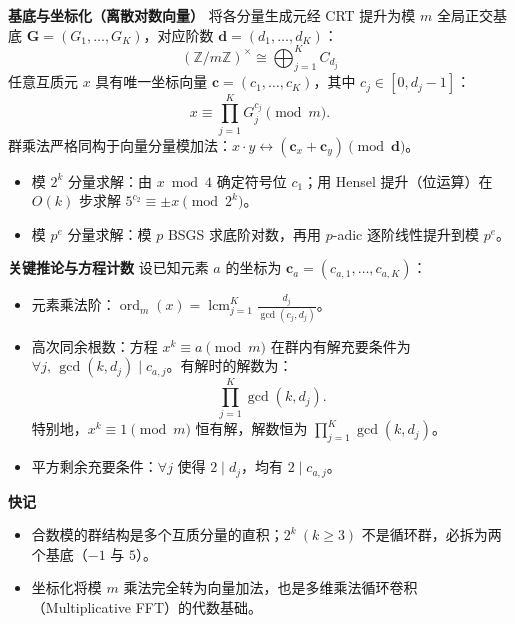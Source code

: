 \textbf{基底与坐标化（离散对数向量）}
将各分量生成元经 CRT 提升为模 $m$ 全局正交基底 $\mathbf{G} = (G_1, \dots, G_K)$，对应阶数 $\mathbf{d} = (d_1, \dots, d_K)$：
\[
(\mathbb{Z}/m\mathbb{Z})^\times \cong \bigoplus_{j=1}^K C_{d_j}
\]
任意互质元 $x$ 具有唯一坐标向量 $\mathbf{c} = (c_1, \dots, c_K)$，其中 $c_j \in [0, d_j - 1]$：
\[
x \equiv \prod_{j=1}^K G_j^{c_j} \pmod m.
\]
群乘法严格同构于向量分量模加法：$x \cdot y \leftrightarrow (\mathbf{c}_x + \mathbf{c}_y) \pmod{\mathbf{d}}$。
\begin{itemize}
\item 模 $2^k$ 分量求解：由 $x\bmod 4$ 确定符号位 $c_1$；用 Hensel 提升（位运算）在 $O(k)$ 步求解 $5^{c_2}\equiv \pm x\pmod{2^k}$。
\item 模 $p^e$ 分量求解：模 $p$ BSGS 求底阶对数，再用 $p$-adic 逐阶线性提升到模 $p^e$。
\end{itemize}

\textbf{关键推论与方程计数}
设已知元素 $a$ 的坐标为 $\mathbf{c}_a = (c_{a,1}, \dots, c_{a,K})$：
\begin{itemize}
\item 元素乘法阶：$\operatorname{ord}_m(x) = \operatorname{lcm}_{j=1}^K \frac{d_j}{\gcd(c_j, d_j)}$。
\item 高次同余根数：方程 $x^k \equiv a \pmod m$ 在群内有解充要条件为 $\forall j,\, \gcd(k, d_j) \mid c_{a,j}$。有解时的解数为：
\[
\prod_{j=1}^K \gcd(k, d_j).
\]
特别地，$x^k \equiv 1\pmod m$ 恒有解，解数恒为 $\prod_{j=1}^K \gcd(k, d_j)$。
\item 平方剩余充要条件：$\forall j$ 使得 $2\mid d_j$，均有 $2\mid c_{a,j}$。
\end{itemize}

\textbf{快记}
\begin{itemize}
\item 合数模的群结构是多个互质分量的直积；$2^k\ (k\ge 3)$ 不是循环群，必拆为两个基底（$-1$ 与 $5$）。
\item 坐标化将模 $m$ 乘法完全转为向量加法，也是多维乘法循环卷积（Multiplicative FFT）的代数基础。
\end{itemize}
